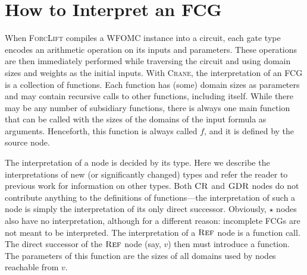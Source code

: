 \documentclass[letterpaper]{article} %
\DeclareMathOperator{\CR}{\textsc{CR}}
\DeclareMathOperator{\GDR}{\textsc{GDR}}
\DeclareMathOperator{\Reff}{\textsc{Ref}}
\theoremstyle{definition}
\theoremstyle{remark}
\begin{document}
\section{How to Interpret an FCG}\label{sec:interpret}

When \textsc{ForcLift} \citep{DBLP:conf/ijcai/BroeckTMDR11} compiles a WFOMC
instance into a circuit, each gate type encodes an arithmetic operation on its
inputs and parameters. These operations are then immediately performed while
traversing the circuit and using domain sizes and weights as the initial inputs.
With \textsc{Crane}, the interpretation of an FCG is a collection of functions.
Each function has (some) domain sizes as parameters and may contain recursive
calls to other functions, including itself. While there may be any number of
subsidiary functions, there is always one main function that can be called with
the sizes of the domains of the input formula as arguments. Henceforth, this
function is always called $f$, and it is defined by the source node.

The interpretation of a node is decided by its type. Here we describe the
interpretations of new (or significantly changed) types and refer the reader to
previous work \citep{DBLP:conf/ijcai/BroeckTMDR11} for information on other
types. Both $\CR$ and $\GDR$ nodes do not contribute anything to the definitions
of functions---the interpretation of such a node is simply the interpretation of
its only direct successor. Obviously, $\star$ nodes also have no interpretation,
although for a different reason: incomplete FCGs are not meant to be
interpreted. The interpretation of a $\Reff$ node is a function call. The direct
successor of the $\Reff$ node (say, $v$) then must introduce a function. The
parameters of this function are the sizes of all domains used by nodes reachable
from $v$.
\end{document}
